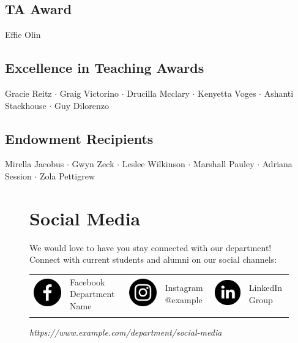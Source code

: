 \documentclass{book} %
\begin{document}
\subsection*{TA Award}
Effie Olin
\subsection*{Excellence in Teaching Awards}
Gracie Reitz $\cdot$ Graig Victorino  $\cdot$ Drucilla Mcclary $\cdot$ Kenyetta Voges $\cdot$ Ashanti Stackhouse $\cdot$ Guy Dilorenzo
\subsection*{Endowment Recipients}
Mirella Jacobus $\cdot$ Gwyn Zeck $\cdot$ Leslee Wilkinson $\cdot$ Marshall Pauley $\cdot$ Adriana Session $\cdot$ Zola Pettigrew


\begin{figure}[b]

\section*{Social Media}
We would love to have you stay connected with our department! Connect with current students and alumni on our social channels:
\smallskip
  \begin{center}
 \begin{tabular}{ m{1cm} m{3cm} m{1cm} m{3cm} m{1cm} m{3cm} }
  \includegraphics[width=.5in]{assets/fb-icon.png} & Facebook Department Name & \includegraphics[width=.5in]{assets/ig-icon.png} & Instagram @example & \includegraphics[width=.5in]{assets/ln-icon.png} & LinkedIn Group\\
  \smallskip \\
 \end{tabular}

 \em https://www.example.com/department/social-media
  \end{center}
\end{figure}
\clearpage
\end{document}
